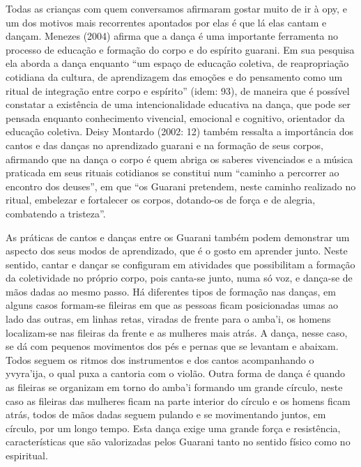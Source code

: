 Todas as crianças com quem conversamos afirmaram gostar muito de ir à
opy, e um dos motivos mais recorrentes apontados por elas é que lá elas
cantam e dançam. Menezes (2004) afirma que a dança é uma importante
ferramenta no processo de educação e formação do corpo e do espírito
guarani. Em sua pesquisa ela aborda a dança enquanto ``um espaço de
educação coletiva, de reapropriação cotidiana da cultura, de
aprendizagem das emoções e do pensamento como um ritual de integração
entre corpo e espírito'' (idem: 93), de maneira que é possível constatar
a existência de uma intencionalidade educativa na dança, que pode ser
pensada enquanto conhecimento vivencial, emocional e cognitivo,
orientador da educação coletiva. Deisy Montardo (2002: 12) também
ressalta a importância dos cantos e das danças no aprendizado guarani e
na formação de seus corpos, afirmando que na dança o corpo é quem
abriga os saberes vivenciados e a música praticada em seus rituais
cotidianos se constitui num ``caminho a percorrer ao encontro dos
deuses'', em que ``os Guarani pretendem, neste caminho realizado no
ritual, embelezar e fortalecer os corpos, dotando-os de força e de
alegria, combatendo a tristeza''.

As práticas de cantos e danças entre os Guarani também podem demonstrar
um aspecto dos seus modos de aprendizado, que é o gosto em aprender
junto. Neste sentido, cantar e dançar se configuram em atividades que
possibilitam a formação da coletividade no próprio corpo, pois canta-se
junto, numa só voz, e dança-se de mãos dadas ao mesmo passo. Há
diferentes tipos de formação nas danças, em alguns casos formam-se
fileiras em que as pessoas ficam posicionadas umas ao lado das outras,
em linhas retas, viradas de frente para o amba’i, os homens
localizam-se nas fileiras da frente e as mulheres mais atrás. A dança,
nesse caso, se dá com pequenos movimentos dos pés e pernas que se
levantam e abaixam. Todos seguem os ritmos dos instrumentos e dos
cantos acompanhando o yvyra’ija, o qual puxa a cantoria com o violão.
Outra forma de dança é quando as fileiras se organizam em torno do
amba’i formando um grande círculo, neste caso as fileiras das mulheres
ficam na parte interior do círculo e os homens ficam atrás, todos de
mãos dadas seguem pulando e se movimentando juntos, em círculo, por um
longo tempo. Esta dança exige uma grande força e resistência,
características que são valorizadas pelos Guarani tanto no sentido
físico como no espiritual.

